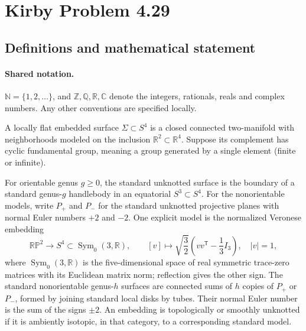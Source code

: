 \documentclass[11pt]{article}
\begin{document}
\section{Kirby Problem 4.29}\label{statement}

\subsection{Definitions and mathematical statement}

\paragraph{Shared notation.}$\mathbb N=\{1,2,\ldots\}$, and $\mathbb Z,\mathbb Q,\mathbb R,\mathbb C$ denote the integers, rationals, reals and complex numbers. Any other conventions are specified locally.


A locally flat embedded surface $\Sigma\subset S^4$ is a closed connected two-manifold with neighborhoods modeled on the inclusion $\mathbb R^2\subset\mathbb R^4$. Suppose its complement has cyclic fundamental group, meaning a group generated by a single element (finite or infinite).

For orientable genus $g\ge0$, the standard unknotted surface is the boundary of a standard genus-$g$ handlebody in an equatorial $S^3\subset S^4$. For the nonorientable models, write $P_+$ and $P_-$ for the standard unknotted projective planes with normal Euler numbers $+2$ and $-2$. One explicit model is the normalized Veronese embedding
\[
\mathbb{RP}^2\longrightarrow S^4\subset\operatorname{Sym}_0(3,\mathbb R),\qquad
[v]\longmapsto\sqrt{\frac32}\left(vv^{\mathsf T}-\frac13I_3\right),\quad |v|=1,
\]
where $\operatorname{Sym}_0(3,\mathbb R)$ is the five-dimensional space of real symmetric trace-zero matrices with its Euclidean matrix norm; reflection gives the other sign. The standard nonorientable genus-$h$ surfaces are connected sums of $h$ copies of $P_+$ or $P_-$, formed by joining standard local disks by tubes. Their normal Euler number is the sum of the signs $\pm2$. An embedding is topologically or smoothly unknotted if it is ambiently isotopic, in that category, to a corresponding standard model.
\end{document}
